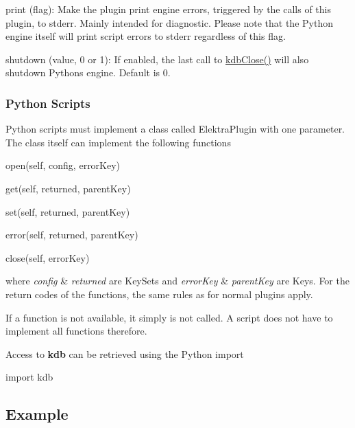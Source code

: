 \begin{DoxyItemize}
\item {\ttfamily print} (flag)\+: Make the plugin print engine errors, triggered by the calls of this plugin, to stderr. Mainly intended for diagnostic. Please note that the Python engine itself will print script errors to stderr regardless of this flag.
\item {\ttfamily shutdown} (value, 0 or 1)\+: If enabled, the last call to {\ttfamily \hyperlink{group__kdb_gadb54dc9fda17ee07deb9444df745c96f}{kdb\+Close()}} will also shutdown Pythons engine. Default is 0.
\end{DoxyItemize}

\subsubsection*{Python Scripts}

Python scripts must implement a class called {\ttfamily Elektra\+Plugin} with one parameter. The class itself can implement the following functions


\begin{DoxyItemize}
\item open(self, config, error\+Key)
\item get(self, returned, parent\+Key)
\item set(self, returned, parent\+Key)
\item error(self, returned, parent\+Key)
\item close(self, error\+Key)
\end{DoxyItemize}

where {\itshape config} \& {\itshape returned} are Key\+Sets and {\itshape error\+Key} \& {\itshape parent\+Key} are Keys. For the return codes of the functions, the same rules as for normal plugins apply.

If a function is not available, it simply is not called. A script does not have to implement all functions therefore.

Access to {\bfseries kdb} can be retrieved using the Python import \begin{DoxyVerb}import kdb
\end{DoxyVerb}


\subsection*{Example}

